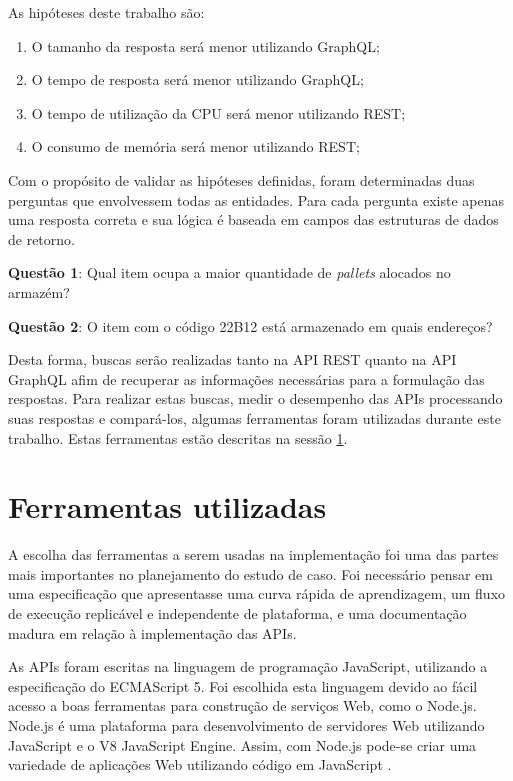 As hipóteses deste trabalho são: 

\begin{enumerate}[label=\alph*)]
\item O tamanho da resposta será menor utilizando GraphQL;
\item O tempo de resposta será menor utilizando GraphQL;
\item O tempo de utilização da CPU será menor utilizando REST;
\item O consumo de memória será menor utilizando REST;
\end{enumerate}

Com o propósito de validar as hipóteses definidas, foram determinadas duas perguntas que envolvessem todas as entidades. Para cada pergunta existe apenas uma resposta correta e sua lógica é baseada em campos das estruturas de dados de retorno.

\textbf{Questão 1}: Qual item ocupa a maior quantidade de \textit{pallets} alocados no armazém?

\textbf{Questão 2}: O item com o código 22B12 está armazenado em quais endereços?

Desta forma, buscas serão realizadas tanto na API REST quanto na API GraphQL afim de recuperar as informações necessárias para a formulação das respostas. Para realizar estas buscas, medir o desempenho das APIs processando suas respostas e compará-los, algumas ferramentas foram utilizadas durante este trabalho. Estas ferramentas estão descritas na sessão \ref{sec:ferramentas}.

\section{Ferramentas utilizadas} \label{sec:ferramentas}

A escolha das ferramentas a serem usadas na implementação foi uma das partes mais importantes no planejamento do estudo de caso. Foi necessário pensar em uma especificação que apresentasse uma curva rápida de aprendizagem, um fluxo de execução replicável e independente de plataforma, e uma documentação madura em relação à implementação das APIs.

As APIs foram escritas na linguagem de programação JavaScript, utilizando a especificação do ECMAScript 5. Foi escolhida esta linguagem devido ao fácil acesso a boas ferramentas para construção de serviços Web, como o Node.js. Node.js é uma plataforma para desenvolvimento de servidores Web utilizando JavaScript e o V8 JavaScript Engine. Assim, com Node.js pode-se criar uma variedade de aplicações Web utilizando código em JavaScript \cite{node-definition}.

